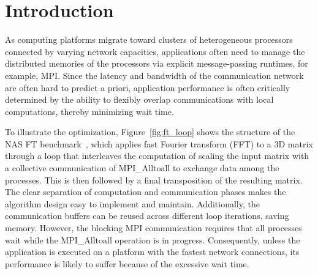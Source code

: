 \section{Introduction}
\label{sec:intro}


%
As computing platforms migrate toward clusters of heterogeneous processors connected by varying
network capacities, applications often need to manage the distributed memories of the processors
via explicit message-passing runtimes, for example, MPI.
Since the latency and bandwidth of the communication network are often hard to predict a priori, application performance is
often critically determined by the ability to flexibly overlap communications with local computations, thereby minimizing
wait time.

To illustrate the optimization, Figure~\ref{fig:ft_loop} shows the structure of the NAS FT benchmark~\cite{npb},
  which applies fast Fourier transform (FFT) to a 3D matrix through a loop that interleaves the computation of scaling  the input matrix
with a collective communication of MPI\_Alltoall to exchange data among the processes. This is then followed by a final transposition
of the resulting matrix.
The clear separation of computation and communication phases makes the algorithm design easy to implement and maintain.
Additionally, the communication buffers can be reused across different loop iterations, saving memory.
However, the blocking MPI communication requires that all processes wait while the MPI\_Alltoall operation is in progress.
Consequently, unless the application is executed on a platform with the fastest network connections, its performance is likely to suffer
because of the excessive wait time.

